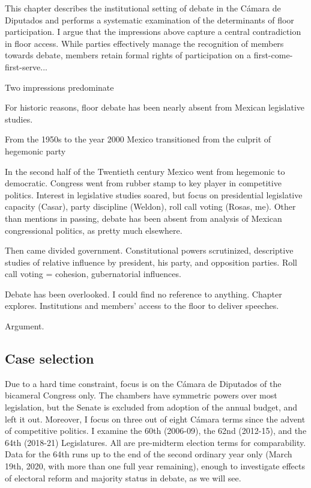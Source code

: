\documentclass[letter,12pt]{article}
\begin{document}
This chapter describes the institutional setting of debate in the Cámara de Diputados and performs a systematic examination of the determinants of floor participation. I argue that the impressions above capture a central contradiction in floor access. While parties effectively manage the recognition of members towards debate, members retain formal rights of participation  on a first-come-first-serve...


Two impressions predominate 

For historic reasons, floor debate has been nearly absent from Mexican legislative studies.


From the 1950s to the year 2000 Mexico transitioned from the culprit of hegemonic party 

In the second half of the Twentieth century Mexico went from hegemonic to democratic. Congress went from rubber stamp to key player in competitive politics. Interest in legislative studies soared, but focus on presidential legislative capacity (Casar), party discipline (Weldon), roll call voting (Rosas, me). Other than mentions in passing, debate has been absent from analysis of Mexican congressional politics, as pretty much elsewhere.   

Then came divided government. Constitutional powers scrutinized, descriptive studies of relative influence by president, his party, and opposition parties. Roll call voting = cohesion, gubernatorial influences.

Debate has been overlooked. I could find no reference to anything. Chapter explores. Institutions and members' access to the floor to deliver speeches.

Argument. 

\subsection{Case selection}

Due to a hard time constraint, focus is on the Cámara de Diputados of the bicameral Congress only. The chambers have symmetric powers over most legislation, but the Senate is excluded from adoption of the annual budget, and left it out. Moreover, I focus on three out of eight Cámara terms since the advent of competitive politics. I examine the 60th (2006-09), the 62nd (2012-15), and the 64th (2018-21) Legislatures. All are pre-midterm election terms for comparability. Data for the 64th runs up to the end of the second ordinary year only (March 19th, 2020, with more than one full year remaining), enough to investigate effects of electoral reform and majority status in debate, as we will see. 
\end{document}
